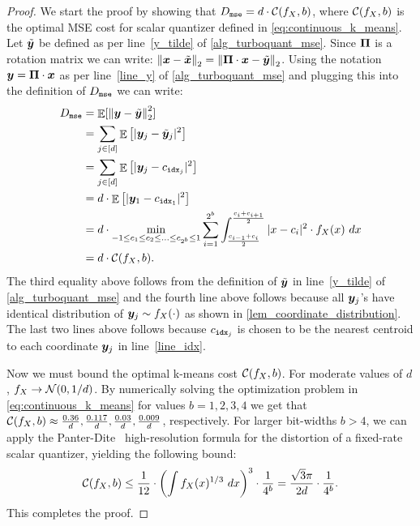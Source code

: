 \documentclass[11pt]{article}
\begin{document}
\begin{proof}
We start the proof by showing that $D_{\tt mse} = d \cdot \mathcal{C}(f_X, b)$, where $\mathcal{C}(f_X, b)$ is the optimal MSE cost for scalar quantizer defined in \cref{eq:continuous_k_means}.
Let $\tilde{{\bm y}}$ be defined as per line~\ref{y_tilde} of \cref{alg_turboquant_mse}.
Since $\boldsymbol{\Pi}$ is a rotation matrix we can write:
$\left\| {\bm x} - \tilde{{\bm x}} \right\|_2 = \left\| \boldsymbol{\Pi} \cdot {\bm x} - \tilde{{\bm y}} \right\|_2$.
Using the notation ${\bm y} = \boldsymbol{\Pi} \cdot {\bm x}$ as per line~\ref{line_y} of \cref{alg_turboquant_mse} and plugging this into the definition of $D_{\tt mse}$ we can write:
\begin{align*}
    D_{\tt mse} &= \mathop{{\mathbb{E}}} [\left\| {\bm y} - \tilde{{\bm y}} \right\|_2^2] \\
    &= \sum_{j \in [d]} \mathop{{\mathbb{E}}}\left[ |{\bm y}_j - \tilde{{\bm y}}_j|^2 \right] \\
    &= \sum_{j \in [d]} \mathop{{\mathbb{E}}}\left[ |{\bm y}_j - c_{{\tt idx}_j}|^2 \right]\\
    &= d \cdot \mathop{{\mathbb{E}}}\left[ |{\bm y}_1 - c_{{\tt idx}_1}|^2 \right] \\
    &= d \cdot \min_{-1 \le c_1 \le c_2 \le \ldots \le c_{2^b} \le 1} \sum_{i=1}^{2^b} \int_{\frac{c_{i-1} + c_i}{2}}^{\frac{c_i + c_{i+1}}{2}} |x - c_i|^2 \cdot f_X(x)~dx \\
    &= d \cdot \mathcal{C}(f_X, b).
\end{align*}
The third equality above follows from the definition of $\tilde{{\bm y}}$ in line~\ref{y_tilde} of \cref{alg_turboquant_mse} and the fourth line above follows because all ${\bm y}_j$'s have identical distribution of ${\bm y}_j \sim f_X(\cdot)$ as shown in \cref{lem_coordinate_distribution}.
The last two lines above follows because $c_{{\tt idx}_j}$ is chosen to be the nearest centroid to each coordinate ${\bm y}_j$ in line~\ref{line_idx}.

Now we must bound the optimal k-means cost $\mathcal{C}(f_X, b)$. 
For moderate values of $d$, $f_X \to \mathcal{N}(0, 1/d)$. 
By numerically solving the optimization problem in \cref{eq:continuous_k_means} for values $b = 1, 2, 3, 4$ we get that $\mathcal{C}(f_X, b) \approx \frac{0.36}{d}, \frac{0.117}{d}, \frac{0.03}{d}, \frac{0.009}{d}$, respectively.
For larger bit-widths $b > 4$, we can apply the Panter-Dite~\cite{panter1951quantization} high-resolution formula for the distortion of a fixed-rate scalar quantizer, yielding the following bound:
\[
\mathcal{C}(f_X, b) \le \frac{1}{12} \cdot \left( \int f_X(x)^{1/3}~dx \right)^3 \cdot \frac{1}{4^b} =  \frac{\sqrt{3} \pi }{2 d} \cdot \frac{1}{4^b}.
\]
This completes the proof.
\end{proof}
\end{document}
